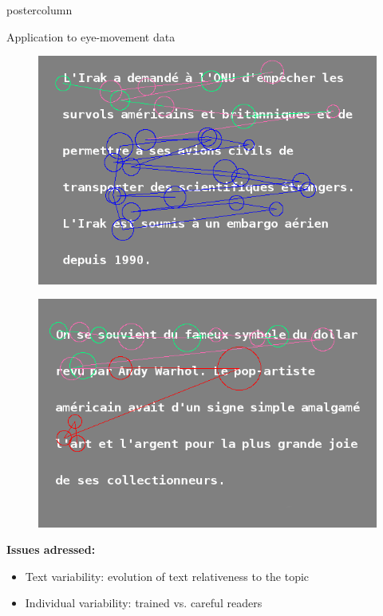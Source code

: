 \documentclass[final,hyperref={pdfpagelabels=false}]{beamer}
\begin{document}
\begin{frame}
\begin{columns}
\begin{column}{.50\textwidth}
\begin{beamercolorbox}[center,wd=\textwidth]{postercolumn}
\begin{minipage}[T]{.98\textwidth}
{\begin{block}{Application to eye-movement data}
\begin{minipage}{0.47\textwidth}
\begin{figure}[h]
                        \centering
                        \includegraphics[width=18cm]{scanpath-careful-reader-subj-8-text-14.png}
                    \end{figure}
                \end{minipage} \hfill
                \begin{minipage}{0.47\textwidth}
                    \begin{figure}[h]
                        \centering
                        \includegraphics[width=18cm]{scanpath-trained-reader-subj-13-text-5.png}
                    \end{figure}
                \end{minipage}
                \vskip 0.5cm
                \textbf{Issues adressed:}
                \begin{itemize}
                    \item[\bullet] Text variability: evolution of text relativeness to the topic
                    \item[\bullet] Individual variability: trained vs. careful readers
                \end{itemize}
            \end{block}

}
\end{minipage}
\end{beamercolorbox}
\end{column}
\end{columns}
\end{frame}
\end{document}
